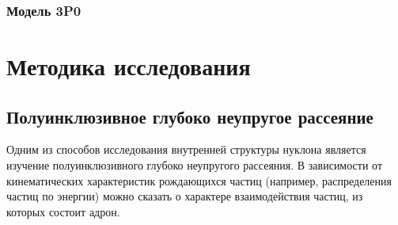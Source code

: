 \documentclass{extreport}
\begin{document}
\subsection{Модель 3P0}
\newpage
\chapter{Методика исследования}
\thispagestyle{myheadings}
\section{Полуинклюзивное глубоко неупругое рассеяние}
Одним из способов исследования внутренней структуры нуклона является изучение полуинклюзивного глубоко неупругого рассеяния. В зависимости от кинематических характеристик рождающихся частиц (например, распределения частиц по энергии) можно сказать о характере взаимодействия частиц, из которых состоит адрон. 
\end{document}

